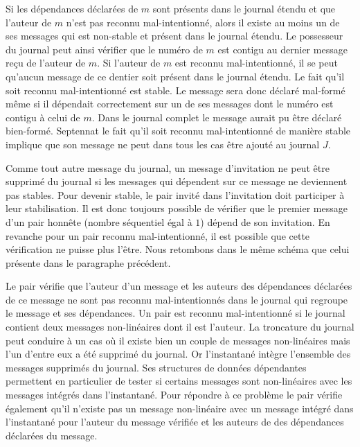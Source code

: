 Si les dépendances déclarées de $m$ sont présents dans le journal étendu et que l'auteur de $m$ n'est pas reconnu mal-intentionné, alors il existe au moins un de ses messages qui est non-stable et présent dans le journal étendu.
Le possesseur du journal peut ainsi vérifier que le numéro de $m$ est contigu au dernier message reçu de l'auteur de $m$.
Si l'auteur de $m$ est reconnu mal-intentionné, il se peut qu'aucun message de ce dentier soit présent dans le journal étendu.
Le fait qu'il soit reconnu mal-intentionné est stable.
Le message sera donc déclaré mal-formé même si il dépendait correctement sur un de ses messages dont le numéro est contigu à celui de $m$.
Dans le journal complet le message aurait pu être déclaré bien-formé.
Septennat le fait qu'il soit reconnu mal-intentionné de manière stable implique que son message ne peut dans tous les cas être ajouté au journal $J$.

Comme tout autre message du journal, un message d'invitation ne peut être supprimé du journal si les messages qui dépendent sur ce message ne deviennent pas stables.
Pour devenir stable, le pair invité dans l'invitation doit participer à leur stabilisation.
Il est donc toujours possible de vérifier que le premier message d'un pair honnête (nombre séquentiel égal à $1$) dépend de son invitation.
En revanche pour un pair reconnu mal-intentionné, il est possible que cette vérification ne puisse plus l'être.
Nous retombons dans le même schéma que celui présente dans le paragraphe précédent.

Le pair vérifie que l'auteur d'un message et les auteurs des dépendances déclarées de ce message ne sont pas reconnu mal-intentionnés dans le journal qui regroupe le message et ses dépendances.
Un pair est reconnu mal-intentionné si le journal contient deux messages non-linéaires dont il est l'auteur.
La troncature du journal peut conduire à un cas où il existe bien un couple de messages non-linéaires mais l'un d'entre eux a été supprimé du journal.
Or l'instantané intègre l'ensemble des messages supprimés du journal.
Ses structures de données dépendantes permettent en particulier de tester si certains messages sont non-linéaires avec les messages intégrés dans l'instantané.
Pour répondre à ce problème le pair vérifie également qu'il n'existe pas un message non-linéaire avec un message intégré dans l'instantané pour l'auteur du message vérifiée et les auteurs de des dépendances déclarées du message.

